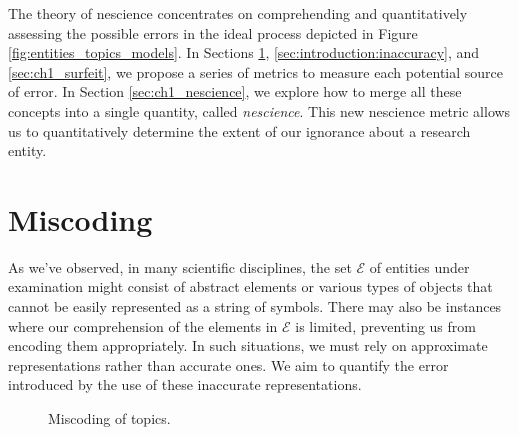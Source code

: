 The theory of nescience concentrates on comprehending and quantitatively assessing the possible errors in the ideal process depicted in Figure \ref{fig:entities_topics_models}. In Sections \ref{sec:ch1_miscoding}, \ref{sec:introduction:inaccuracy}, and \ref{sec:ch1_surfeit}, we propose a series of metrics to measure each potential source of error. In Section \ref{sec:ch1_nescience}, we explore how to merge all these concepts into a single quantity, called \emph{nescience}. This new nescience metric allows us to quantitatively determine the extent of our ignorance about a research entity.

%
%

\section{Miscoding}
\label{sec:ch1_miscoding}

As we've observed, in many scientific disciplines, the set $\mathcal{E}$ of entities under examination might consist of abstract elements or various types of objects that cannot be easily represented as a string of symbols. There may also be instances where our comprehension of the elements in $\mathcal{E}$ is limited, preventing us from encoding them appropriately. In such situations, we must rely on approximate representations rather than accurate ones. We aim to quantify the error introduced by the use of these inaccurate representations.

\begin{figure}[t]
\centering
{}
\caption{\label{fig:miscoding}Miscoding of topics.}
\end{figure}

